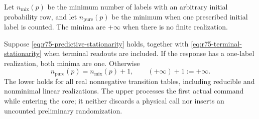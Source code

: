 Let $n_{\mathrm{mix}}(p)$ be the minimum number of labels with an arbitrary
initial probability row, and let $n_{\mathrm{pure}}(p)$ be the minimum when
one prescribed initial label is counted.  The minima are $+\infty$ when
there is no finite realization.

\begin{theorem}
\label{thm:r75-stationary-initializer}
Suppose \eqref{eq:r75-predictive-stationarity} holds, together with
\eqref{eq:r75-terminal-stationarity} when terminal readouts are included.
If the response has
a one-label realization, both minima are one.  Otherwise
\begin{equation}\label{eq:r75-initialization-law}
 n_{\mathrm{pure}}(p)=n_{\mathrm{mix}}(p)+1,
 \qquad (+\infty)+1:=+\infty.
\end{equation}
The lower holds for all real nonnegative transition tables, including
reducible and nonminimal linear realizations.  The upper processes the
first actual command while entering the core; it neither discards a
physical call nor inserts an uncounted preliminary randomization.
\end{theorem}
